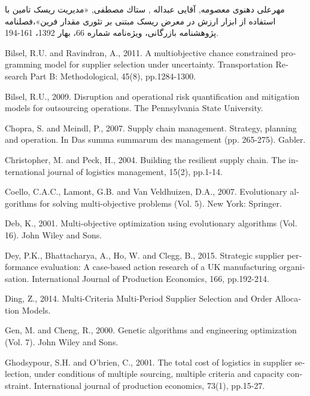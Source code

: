
\begin{thebibliography}{9} \label{chapter:references}
\bibitem{}

مهرعلی دهنوی معصومه, آقايی عبداله , ستاك مصطفی, «مديريت ريسک تامين با استفاده از ابزار ارزش در معرض ريسک مبتنی بر تئوری مقدار فرين»،فصلنامه پژوهشنامه بازرگانی، ویژه‌نامه شماره 66، بهار 1392، 161-194.

	\begin{latin}

		 Bilsel, R.U. and Ravindran, A., 2011. A multiobjective chance constrained programming model for supplier selection under uncertainty. Transportation Research Part B: Methodological, 45(8), pp.1284-1300.
		
		 Bilsel, R.U., 2009. Disruption and operational risk quantification and mitigation models for outsourcing operations. The Pennsylvania State University.
		
    		 Chopra, S. and Meindl, P., 2007. Supply chain management. Strategy, planning and operation. In Das summa summarum des management (pp. 265-275). Gabler.
    	
    			 Christopher, M. and Peck, H., 2004. Building the resilient supply chain. The international journal of logistics management, 15(2), pp.1-14.
    	
    			 Coello, C.A.C., Lamont, G.B. and Van Veldhuizen, D.A., 2007. Evolutionary algorithms for solving multi-objective problems (Vol. 5). New York: Springer.
    			
		 Deb, K., 2001. Multi-objective optimization using evolutionary algorithms (Vol. 16). John Wiley and Sons.    			
    			
		 Dey, P.K., Bhattacharya, A., Ho, W. and Clegg, B., 2015. Strategic supplier performance evaluation: A case-based action research of a UK manufacturing organisation. International Journal of Production Economics, 166, pp.192-214.
	
		 Ding, Z., 2014. Multi-Criteria Multi-Period Supplier Selection and Order Allocation Models.

		 Gen, M. and Cheng, R., 2000. Genetic algorithms and engineering optimization (Vol. 7). John Wiley and Sons.
			
			 Ghodsypour, S.H. and O’brien, C., 2001. The total cost of logistics in supplier selection, under conditions of multiple sourcing, multiple criteria and capacity constraint. International journal of production economics, 73(1), pp.15-27.
		

\end{latin}
\end{thebibliography}
